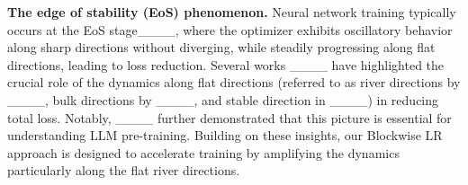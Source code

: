 
{\bf The edge of stability (EoS) phenomenon.} Neural network training typically occurs at the EoS stage____, where the optimizer exhibits oscillatory behavior along sharp directions without diverging, while steadily progressing along flat directions, leading to loss reduction. Several works ____ have highlighted the crucial role of the dynamics along flat directions (referred to as river directions by ____, bulk directions by ____, and stable direction in ____) in reducing total loss. Notably, ____ further demonstrated that this picture is essential for understanding LLM pre-training. Building on these insights, our Blockwise LR approach is designed to accelerate training by amplifying the dynamics particularly along the flat river directions.






